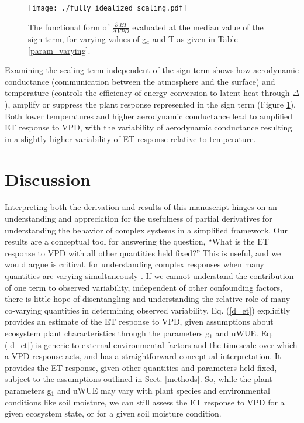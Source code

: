 \documentclass[draft]{agujournal2019}
\begin{document}
\begin{figure}
  \centering \texttt{[image: ./fully\_idealized\_scaling.pdf]}
  \caption{The functional form of $\frac{\partial \; ET}{\partial
      \; VPD}$ evaluated at the median value of the sign term, for
    varying values of g$_a$ and T as given in Table \ref{param_varying}.}
  \label{scaling}
\end{figure}

Examining the scaling term independent of the sign term shows how
aerodynamic conductance (communication between the atmosphere and the
surface) and temperature (controls the efficiency of energy conversion
to latent heat through $\Delta$), amplify or suppress the plant
response represented in the sign term (Figure \ref{scaling}). Both
lower temperatures and higher aerodynamic conductance lead to
amplified ET response to VPD, with the variability of aerodynamic
conductance resulting in a slightly higher variability of ET response
relative to temperature.

\section{Discussion}
\label{discussion}

Interpreting both the derivation and results of this manuscript hinges
on an understanding and appreciation for the usefulness of partial
derivatives for understanding the behavior of complex systems in a
simplified framework. Our results are a conceptual tool for answering
the question, ``What is the ET response to VPD with all other
quantities held fixed?'' This is useful, and we would argue is
critical, for understanding complex responses when many quantities are
varying simultaneously \cite{Zhou_2019}. If we cannot understand the
contribution of one term to observed variability, independent of other
confounding factors, there is little hope of disentangling and
understanding the relative role of many co-varying quantities in
determining observed variability.  Eq. (\ref{d_et}) explicitly
provides an estimate of the ET response to VPD, given assumptions
about ecosystem plant characteristics through the parameters g$_1$ and
uWUE. Eq. (\ref{d_et}) is generic to external environmental factors
and the timescale over which a VPD response acts, and has a
straightforward conceptual interpretation. It provides the ET
response, given other quantities and parameters held fixed, subject to
the assumptions outlined in Sect. \ref{methods}. So, while the plant
parameters g$_1$ and uWUE may vary with plant species and
environmental conditions like soil moisture, we can still assess the
ET response to VPD for a given ecosystem state, or for a given soil
moisture condition.
\end{document}
